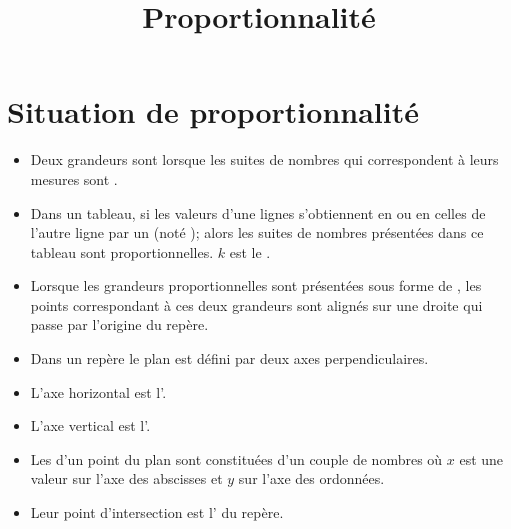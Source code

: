 \documentclass[12pt,a4paper]{article}
\date{}
\title{Proportionnalité}
\begin{document}
\maketitle

\section{Situation de proportionnalité}

\begin{mydefs}
	\begin{itemize}
		\item 	Deux grandeurs sont  lorsque les suites de nombres qui correspondent à leurs mesures sont .
		
		\item Dans un tableau, si les valeurs d'une lignes s'obtiennent en  ou en  celles de l'autre ligne par un  (noté ); alors les suites de nombres présentées dans ce tableau sont proportionnelles. $k$ est le  .
		
		\item Lorsque les grandeurs proportionnelles sont présentées sous forme de , les points correspondant à ces deux grandeurs sont alignés sur une droite qui passe par l'origine du repère. 
		
	\end{itemize}

	
\end{mydefs}

\begin{myraps}
	\begin{itemize}
		\item Dans un repère  le plan est défini par deux axes perpendiculaires.
		\item L'axe horizontal est l'.
		\item L'axe vertical est l'.
		\item Les  d'un point du plan sont constituées d'un couple de nombres  où $x$ est une valeur sur l'axe des abscisses et $y$ sur l'axe des ordonnées.
		\item Leur point d'intersection est l' du repère.
	\end{itemize}
\end{myraps}


\end{document}
